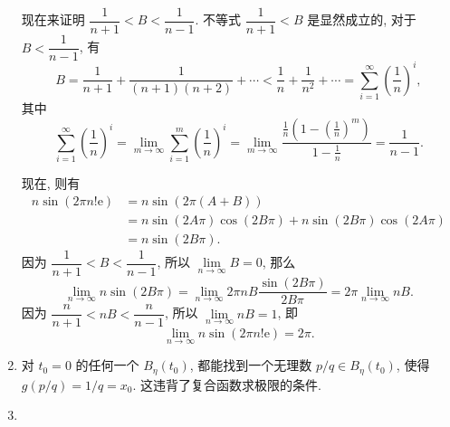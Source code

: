 \begin{enumerate}
        现在来证明 $\dfrac{1}{n+1} < B < \dfrac{1}{n-1}$. 不等式 $\dfrac{1}{n+1} < B$ 是显然成立的, 对于 $B < \dfrac{1}{n-1}$, 有
        \[
            B = \frac{1}{n+1} + \frac{1}{(n+1)(n+2)} + \cdots < \frac1n + \frac{1}{n^2} + \cdots = \sum_{i=1}^\infty\left(\frac1n\right)^i,
        \]
        其中
        \[
            \sum_{i=1}^\infty\left(\frac1n\right)^i = \lim_{m\to\infty}\sum_{i=1}^m\left(\frac1n\right)^i = \lim_{m\to\infty}\frac{\frac1n\left(1 - \left(\frac1n\right)^m\right)}{1 - \frac1n} = \frac{1}{n-1}.   
        \]
        
        现在, 则有
        \begin{align*}
            n\sin(2\pi n!\mathrm{e}) &= n\sin\left(2\pi (A+B)\right) \\
                                     &= n\sin(2A\pi)\cos(2B\pi) + n\sin(2B\pi)\cos(2A\pi) \\
                                     &= n\sin(2B\pi). 
        \end{align*}
        因为 $\dfrac{1}{n+1} < B < \dfrac{1}{n-1}$, 所以 $\lim\limits_{n\to\infty}B = 0$, 那么
        \[
            \lim\limits_{n\to\infty} n\sin(2B\pi) = \lim\limits_{n\to\infty} 2\pi nB \frac{\sin(2B\pi)}{2B\pi} = 2\pi\lim\limits_{n\to\infty}nB. 
        \]
        因为 $\dfrac{n}{n+1} < nB < \dfrac{n}{n-1}$, 所以 $\lim\limits_{n\to\infty}nB = 1$, 即
        \[
            \lim\limits_{n\to\infty} n\sin(2\pi n!\mathrm{e}) = 2\pi.    
        \]
    \item %
        对 $t_0 = 0$ 的任何一个 $B_\eta(t_0)$, 都能找到一个无理数 $p/q \in B_\eta(t_0)$, 使得 $g(p/q) = 1/q = x_0$. 这违背了复合函数求极限的条件.
    \item %
\end{enumerate}

% 